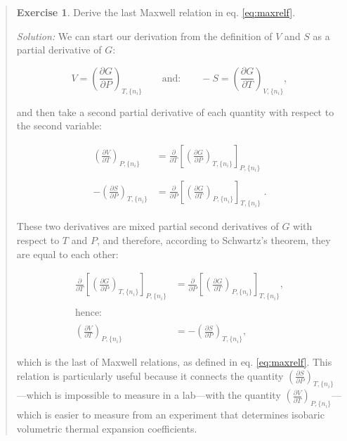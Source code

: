 \documentclass[
  9pt,
]{extbook}
\theoremstyle{definition}
\theoremstyle{definition}
\theoremstyle{definition}
\newtheorem{exercise}{Exercise}[chapter]
\theoremstyle{remark}
\begin{document}
\begin{quote}
\begin{exercise}
\protect\hypertarget{exr:maxwellEx}{}{\label{exr:maxwellEx} }Derive the last Maxwell relation in eq. \eqref{eq:maxrelf}.

\emph{Solution:} We can start our derivation from the definition of \(V\) and \(S\) as a partial derivative of \(G\):

\begin{equation}
 V = \left(\frac{\partial G}{\partial P} \right)_{T,\{n_i\}} \qquad \text{and:} \qquad -S = \left(\frac{\partial G}{\partial T} \right)_{V,\{n_i\}},
\end{equation}

and then take a second partial derivative of each quantity with respect to the second variable:

\begin{equation}
\begin{aligned}
 \left(\frac{\partial V}{\partial T} \right)_{P,\{n_i\}} &=\frac{\partial}{\partial T}\left[ \left(\frac{\partial G}{\partial P} \right)_{T,\{n_i\}} \right]_{P,\{n_i\}} \\
\\
-\left(\frac{\partial S}{\partial P} \right)_{T,\{n_i\}} &=\frac{\partial}{\partial P}\left[ \left(\frac{\partial G}{\partial T} \right)_{P,\{n_i\}} \right]_{T,\{n_i\}} \;.
\end{aligned}
\end{equation}

These two derivatives are mixed partial second derivatives of \(G\) with respect to \(T\) and \(P\), and therefore, according to Schwartz's theorem, they are equal to each other:

\begin{equation}
\begin{aligned}
\frac{\partial}{\partial T}\left[ \left(\frac{\partial G}{\partial P} \right)_{T,\{n_i\}} \right]_{P,\{n_i\}} &=
\frac{\partial}{\partial P}\left[ \left(\frac{\partial G}{\partial T} \right)_{P,\{n_i\}} \right]_{T,\{n_i\}}, \\
\\
\text{hence:} \\
\\
 \left(\frac{\partial V}{\partial T} \right)_{P,\{n_i\}} &= -\left(\frac{\partial S}{\partial P} \right)_{T,\{n_i\}},
\end{aligned}
\end{equation}

which is the last of Maxwell relations, as defined in eq. \eqref{eq:maxrelf}. This relation is particularly useful because it connects the quantity \(\left(\frac{\partial S}{\partial P} \right)_{T,\{n_i\}}\)---which is impossible to measure in a lab---with the quantity \(\left(\frac{\partial V}{\partial T} \right)_{P,\{n_i\}}\)---which is easier to measure from an experiment that determines isobaric volumetric thermal expansion coefficients.
\end{exercise}
\end{quote}
\end{document}
